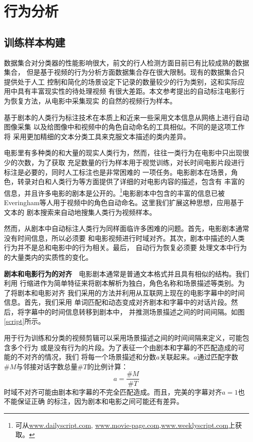 \chapter{行为分析}
\section{训练样本构建}
数据集合对分类器的性能影响很大，前文的行人检测方面目前已有比较成熟的数据集合\cite{survey}，
但是基于视频的行为分析方面数据集合存在很大限制。现有的数据集合\cite{kth}只提供处于人工
控制和简化的场景设定下记录的数量较少的行为类别，这和实际应用中具有丰富现实性的待处理视频
有很大差距。本文参考\cite{stip}提出的自动标注电影行为恢复方法，从电影中采集现实
的自然的视频行为样本。

基于剧本的人类行为标注技术在本质上和近来一些采用文本信息从网络上进行自动图像采集\cite{optimol}
以及给图像中\cite{names}和视频中\cite{buffy}的角色自动命名的工具相似。不同的是这项工作将
采用更加精细的文本分类工具来克服文本描述的类内差异。

电影里有多种类的和大量的现实人类行为，然而，往往一类行为在电影中只出现很少的次数，为了获取
充足数量的行为样本用于视觉训练，对长时间电影片段进行标注是必要的，同时人工标注也是非常困难的
一项任务。电影剧本在场景，角色，转录对白和人类行为等方面提供了详细的对电影内容的描述，包含有
丰富的信息，并且许多电影的剧本是公开的。\footnote{可从\url{www.dailyscript.com},
\url{www.movie-page.com},\url{www.weeklyscript.com}上获取。}电影剧本中包含的丰富的信息已被
Everingham等人用于视频中的角色自动命名\cite{buffy}。这里我们扩展这种思想，应用基于文本的
剧本搜索来自动地搜集人类行为视频样本。

然而，从剧本中自动标注人类行为同样面临许多困难的问题。首先，电影剧本通常没有时间信息，所以必须要
和电影视频进行时域对齐。其次，剧本中描述的人类行为并不是总和电影中的行为相关。最后，
自动行为恢复必须要
处理文本中行为的大量类内的实质性的变化。

\textbf{剧本和电影行为的对齐}~~电影剧本通常是普通文本格式并且具有相似的结构。我们利用
行缩进作为简单特征来将剧本解析为独白，角色名称和场景描述等类别。为了将剧本和电影对齐
我们采用\cite{buffy}的方法并利用从互联网上现在的电影字幕中的时间信息。首先，我们采用
单词匹配和动态变成对齐剧本和字幕中的对话片段。然后，将字幕中的时间信息转移到剧本中，
并推测场景描述之间的时间间隔。如图\ref{script}所示。

用于行为训练和分类的视频剪辑可以采用场景描述之间的时间间隔来定义，可能包含多个行为
或是没有行为的片段。为了表征一个由剧本和字幕的不匹配造成的可能的不对齐的情况，我们
将每一个场景描述和分数$a$关联起来。$a$通过匹配字数$\#M$与邻接对话字数总量$\#T$的比例计算：
\begin{equation}
    a=\frac{\#M}{\#T}
\end{equation}
时域不对齐可能由剧本和字幕的不完全匹配造成。而且，完美的字幕对齐$a=1$也不能保证正确
的标注，因为剧本和电影之间可能还有差异。

